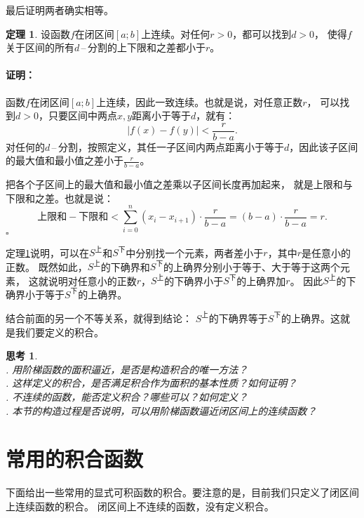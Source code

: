 \documentclass[12pt,UTF8]{ctexbook}
\newcommand{\dash}{\,–\,}
\theoremstyle{definition}
\newtheorem{tm}{定理}[section]
\theoremstyle{plain}
\newtheorem{sk}{思考}[section]
\renewenvironment{proof}{\paragraph{\textbf{证明：}}}{\hfill$\square$}
\begin{document}
\begin{appendix}
最后证明两者确实相等。

\begin{tm}\label{tm:c-1-10}
    设函数$f$在闭区间$[a; b]$上连续。对任何$r>0$，都可以找到$d>0$，
    使得$f$关于区间的所有$d$\dash 分割的上下限和之差都小于$r$。
\end{tm}

\begin{proof}
    函数$f$在闭区间$[a; b]$上连续，因此一致连续。也就是说，对任意正数$r$，
    可以找到$d>0$，只要区间中两点$x,y$距离小于等于$d$，就有：
    $$ |f(x) - f(y)| < \frac{r}{b - a}. $$
    对任何的$d$\dash 分割，按照定义，其任一子区间内两点距离小于等于$d$，因此该子区间的最大值和最小值之差小于$\frac{r}{b - a}$。
    
    把各个子区间上的最大值和最小值之差乘以子区间长度再加起来，
    就是上限和与下限和之差。也就是说：
    $$ \mbox{上限和} - \mbox{下限和} < \sum_{i=0}^n (x_i - x_{i+1}) \cdot \frac{r}{b - a} = (b - a) \cdot \frac{r}{b - a} = r.$$
\end{proof}

定理\ref{tm:c-1-10}说明，可以在$S^{\text{上}}$和$S^{\text{下}}$中分别找一个元素，两者差小于$r$，其中$r$是任意小的正数。
既然如此，$S^{\text{上}}$的下确界和$S^{\text{下}}$的上确界分别小于等于、大于等于这两个元素，
这就说明对任意小的正数$r$，$S^{\text{上}}$的下确界小于$S^{\text{下}}$的上确界加$r$。
因此$S^{\text{上}}$的下确界小于等于$S^{\text{下}}$的上确界。

结合前面的另一个不等关系，就得到结论：
$S^{\text{上}}$的下确界等于$S^{\text{下}}$的上确界。这就是我们要定义的积合。

\begin{sk}
    \mbox{} \\
    . 用阶梯函数的面积逼近，是否是构造积合的唯一方法？ \\
    . 这样定义的积合，是否满足积合作为面积的基本性质？如何证明？\\
    . 不连续的函数，能否定义积合？哪些可以？如何定义？\\
    . 本节的构造过程是否说明，可以用阶梯函数逼近闭区间上的连续函数？
\end{sk}

\section{常用的积合函数}

下面给出一些常用的显式可积函数的积合。要注意的是，目前我们只定义了闭区间上连续函数的积合。
闭区间上不连续的函数，没有定义积合。


\end{appendix}
\end{document}
